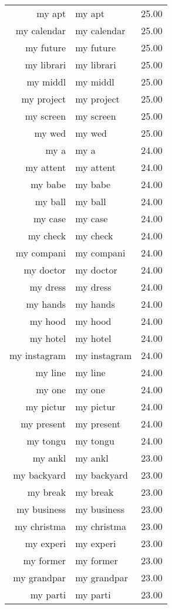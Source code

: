 \begin{table}[ht]
\begin{tabular}{rlr}
  my apt & my apt & 25.00 \\ 
  my calendar & my calendar & 25.00 \\ 
  my future & my future & 25.00 \\ 
  my librari & my librari & 25.00 \\ 
  my middl & my middl & 25.00 \\ 
  my project & my project & 25.00 \\ 
  my screen & my screen & 25.00 \\ 
  my wed & my wed & 25.00 \\ 
  my a & my a & 24.00 \\ 
  my attent & my attent & 24.00 \\ 
  my babe & my babe & 24.00 \\ 
  my ball & my ball & 24.00 \\ 
  my case & my case & 24.00 \\ 
  my check & my check & 24.00 \\ 
  my compani & my compani & 24.00 \\ 
  my doctor & my doctor & 24.00 \\ 
  my dress & my dress & 24.00 \\ 
  my hands & my hands & 24.00 \\ 
  my hood & my hood & 24.00 \\ 
  my hotel & my hotel & 24.00 \\ 
  my instagram & my instagram & 24.00 \\ 
  my line & my line & 24.00 \\ 
  my one & my one & 24.00 \\ 
  my pictur & my pictur & 24.00 \\ 
  my present & my present & 24.00 \\ 
  my tongu & my tongu & 24.00 \\ 
  my ankl & my ankl & 23.00 \\ 
  my backyard & my backyard & 23.00 \\ 
  my break & my break & 23.00 \\ 
  my business & my business & 23.00 \\ 
  my christma & my christma & 23.00 \\ 
  my experi & my experi & 23.00 \\ 
  my former & my former & 23.00 \\ 
  my grandpar & my grandpar & 23.00 \\ 
  my parti & my parti & 23.00 \\ 

\end{tabular}
\end{table}
